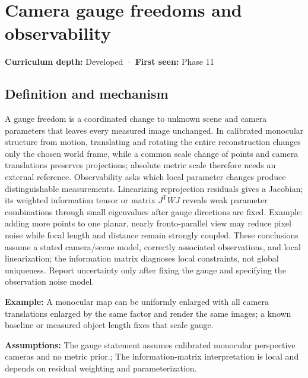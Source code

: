\hypertarget{appendix-113f0267e5f4}{}\label{referencestart:appendix-113f0267e5f4}
\section{Camera gauge freedoms and observability}\label{appendix-113f0267e5f4-camera-gauge-freedoms-and-observability}

\textbf{Curriculum depth:} Developed · \textbf{First seen:} Phase 11

\begin{allmightroledefinition}

\subsection{Definition and mechanism}\label{appendix-113f0267e5f4-definition-and-mechanism}

A gauge freedom is a coordinated change to unknown scene and camera parameters that leaves every measured image unchanged. In calibrated monocular structure from motion, translating and rotating the entire reconstruction changes only the chosen world frame, while a common scale change of points and camera translations preserves projections; absolute metric scale therefore needs an external reference. Observability asks which local parameter changes produce distinguishable measurements. Linearizing reprojection residuals gives a Jacobian; its weighted information tensor or matrix \(J^{\mathsf T}WJ\) reveals weak parameter combinations through small eigenvalues after gauge directions are fixed. Example: adding more points to one planar, nearly fronto-parallel view may reduce pixel noise while focal length and distance remain strongly coupled. These conclusions assume a stated camera/scene model, correctly associated observations, and local linearization; the information matrix diagnoses local constraints, not global uniqueness. Report uncertainty only after fixing the gauge and specifying the observation noise model.

\end{allmightroledefinition}

\textbf{Example:} A monocular map can be uniformly enlarged with all camera translations enlarged by the same factor and render the same images; a known baseline or measured object length fixes that scale gauge.

\textbf{Assumptions:} The gauge statement assumes calibrated monocular perspective cameras and no metric prior.; The information-matrix interpretation is local and depends on residual weighting and parameterization.

